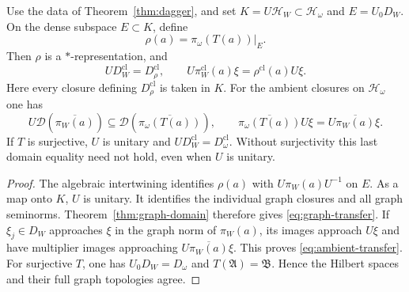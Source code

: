 \documentclass[11pt]{article}
\numberwithin{equation}{section}
\begin{document}
\begin{proposition}
Use\label{prop:graph-transfer} the data of Theorem~\ref{thm:dagger}, and set
$K=U\mathcal H_W\subset\mathcal H_\omega$ and $E=U_0D_W$.
On the dense subspace $E\subset K$, define
\[
 \rho(a)=\pi_\omega(T(a))|_E.
\]
Then $\rho$ is a $*$-representation, and
\begin{equation}
 U D_W^{\mathrm{cl}}=D_\rho^{\mathrm{cl}},
 \qquad
 U\pi_W^{\mathrm{cl}}(a)\xi=\rho^{\mathrm{cl}}(a)U\xi.
 \label{eq:graph-transfer}
\end{equation}
Here every closure defining $D_\rho^{\mathrm{cl}}$ is taken in $K$.
For the ambient closures on $\mathcal H_\omega$ one has
\begin{equation}
 U\mathcal D(\overline{\pi_W(a)})
 \subseteq\mathcal D(\overline{\pi_\omega(T(a))}),
 \qquad
 \overline{\pi_\omega(T(a))}U\xi
 =U\overline{\pi_W(a)}\xi.
 \label{eq:ambient-transfer}
\end{equation}
If $T$ is surjective, $U$ is unitary and
$U D_W^{\mathrm{cl}}=D_\omega^{\mathrm{cl}}$.
Without surjectivity this last domain equality need not hold,
even when $U$ is unitary.
\end{proposition}

\begin{proof}
The algebraic intertwining identifies $\rho(a)$ with
$U\pi_W(a)U^{-1}$ on $E$.  As a map onto $K$, $U$ is unitary.
It identifies the individual graph closures and all graph seminorms.
Theorem~\ref{thm:graph-domain} therefore gives \eqref{eq:graph-transfer}.
If $\xi_j\in D_W$ approaches $\xi$ in the graph norm of
$\pi_W(a)$, its images approach $U\xi$ and have multiplier images
approaching $U\overline{\pi_W(a)}\xi$.
This proves \eqref{eq:ambient-transfer}.
For surjective $T$, one has $U_0D_W=D_\omega$ and $T(\mathfrak A)=\mathfrak B$.
Hence the Hilbert spaces and their full graph topologies agree.
\end{proof}
\end{document}
